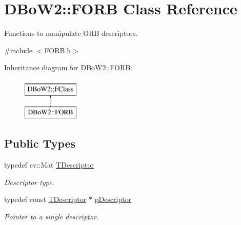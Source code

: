 \hypertarget{class_d_bo_w2_1_1_f_o_r_b}{}\section{D\+Bo\+W2\+:\+:F\+O\+RB Class Reference}
\label{class_d_bo_w2_1_1_f_o_r_b}


Functions to manipulate O\+RB descriptors.  




{\ttfamily \#include $<$F\+O\+R\+B.\+h$>$}

Inheritance diagram for D\+Bo\+W2\+:\+:F\+O\+RB\+:\begin{figure}[H]
\begin{center}
\leavevmode
\includegraphics[height=2.000000cm]{class_d_bo_w2_1_1_f_o_r_b}
\end{center}
\end{figure}
\subsection*{Public Types}
\begin{DoxyCompactItemize}
\item 
typedef cv\+::\+Mat \mbox{\hyperlink{class_d_bo_w2_1_1_f_o_r_b_aef9b966d0293836fab9f55f1799ce0ed}{T\+Descriptor}}
\begin{DoxyCompactList}\small\item\em Descriptor type. \end{DoxyCompactList}\item 
typedef const \mbox{\hyperlink{class_d_bo_w2_1_1_f_o_r_b_aef9b966d0293836fab9f55f1799ce0ed}{T\+Descriptor}} $\ast$ \mbox{\hyperlink{class_d_bo_w2_1_1_f_o_r_b_ab52a6568044027cf30c8ac1514fed1a6}{p\+Descriptor}}
\begin{DoxyCompactList}\small\item\em Pointer to a single descriptor. \end{DoxyCompactList}\end{DoxyCompactItemize}
